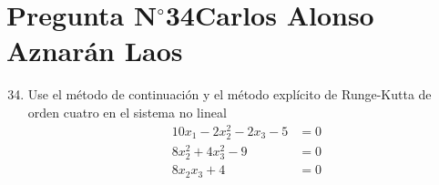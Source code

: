 \section{Pregunta N$^{\circ}$34\qquad Carlos Alonso Aznarán Laos}


% 



\begin{frame}
	\begin{enumerate}\setcounter{enumi}{33}
		\item

		      Use el método de continuación y el método explícito de
		      Runge-Kutta de orden cuatro en el sistema no lineal
		      \begin{align*}
			      10x_{1}-2x^{2}_{2}-2x_{3}-5 & =0 \\
			      8x^2_{2}+4x^2_{3}-9         & =0 \\
			      8x_{2}x_{3}+4               & =0
		      \end{align*}
	\end{enumerate}


\end{frame}
